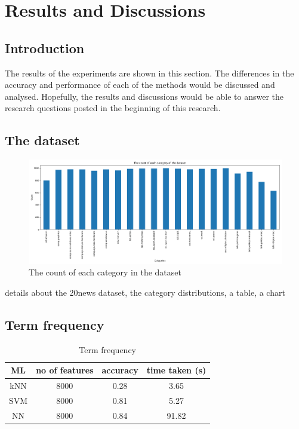 
\chapter{Results and Discussions}

\section{Introduction}
The results of the experiments are shown in this section. The differences in the accuracy and performance of each of the methods would be discussed and analysed. Hopefully, the results and discussions would be able to answer the research questions posted in the beginning of this research.

\section{The dataset}
\graphicspath{{./images/}}

\begin{figure} [ht]
\centering
\includegraphics[width=\textwidth]{count}
\caption{The count of each category in the dataset}
\label{fig:freqCount}
\end{figure}
details about the 20news dataset, the category distributions, a table, a chart

\section{Term frequency}

\begin{table}[ht]
	\centering
	\begin{tabular}{|| c | c | c | c||}
		\hline
		ML & no of features & accuracy & time taken (s) \\ [0.5ex]
		\hline\hline
		kNN & 8000 & 0.28 & 3.65 \\ 
		\hline
		SVM & 8000 & 0.81 & 5.27 \\
		\hline
		NN & 8000 & 0.84 & 91.82 \\
		\hline
	\end{tabular}
\caption{Term frequency}
\label{tbl:termFrequency}
\end{table}

